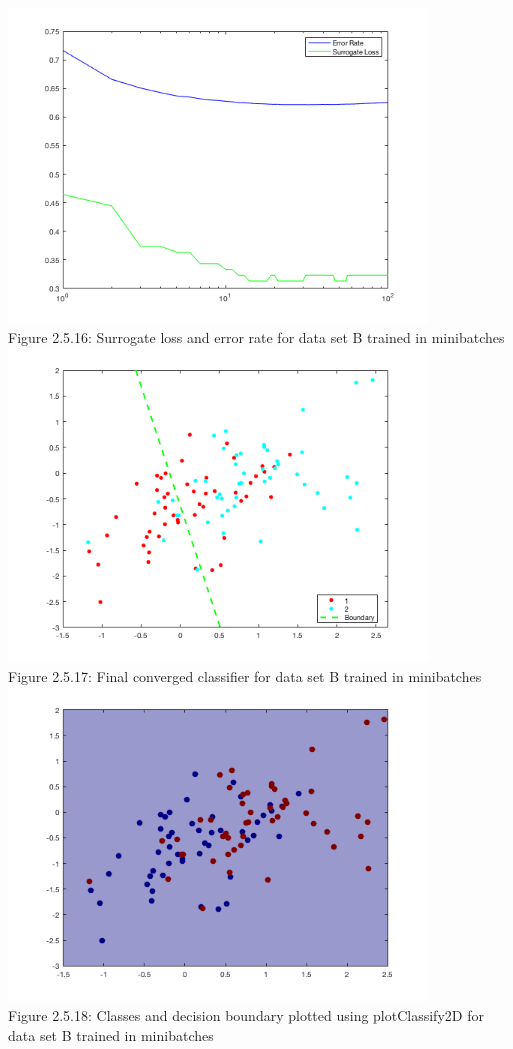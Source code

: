 \documentclass[]{scrreprt}   %
\begin{document}
\begin{center}
	\includegraphics[width=30em,keepaspectratio]{p5figure16.png}\\
	{Figure 2.5.16: Surrogate loss and error rate for data set B trained in minibatches}
	\includegraphics[width=30em,keepaspectratio]{p5figure17.png}\\
	{Figure 2.5.17: Final converged classifier for data set B trained in minibatches}
	\includegraphics[width=30em,keepaspectratio]{p5figure18.png}\\
	{Figure 2.5.18: Classes and decision boundary plotted using plotClassify2D for data set B trained in minibatches}
\end{center} 
\end{document}

